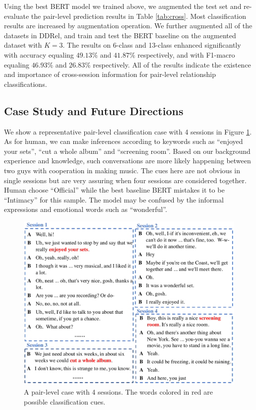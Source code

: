 Using the best BERT model we trained above, we augmented the test set and re-evaluate the pair-level prediction results in Table \ref{tab:cross}. Most classification results are increased by augmentation operation. We further augmented all of the datasets in DDRel, and train and test the BERT baseline on the augmented dataset with $K=3$. The results on 6-class and 13-class enhanced significantly with accuracy equaling $49.13\%$ and $41.87\%$ respectively, and with F1-macro equaling $46.93\%$  and $26.83\%$ respectively. All of the results indicate the existence and importance of cross-session information for pair-level relationship classifications.




\subsection{Case Study and Future Directions}
We show a representative pair-level classification case with 4 sessions in Figure \ref{fig:case}. As for human, we can make inferences according to keywords 
such as ``enjoyed your sets'', ``cut a whole album'' and ``screening room''. Based on our background experience and knowledge, such conversations are more likely happening between two guys with cooperation in making music. The cues here are not obvious in single sessions but are very assuring when four sessions are considered together. Human choose ``Official'' while the best baseline BERT mistakes it to be ``Intimacy'' for this sample. The model may be confused by the informal expressions and emotional words such as ``wonderful''.


\begin{figure}[t!]
	\centering
	\includegraphics[width=1.0\columnwidth]{casestudy.pdf}
	\caption{A pair-level case with 4 sessions. The words colored in red are possible classification cues. }
	\label{fig:case}
\end{figure}

